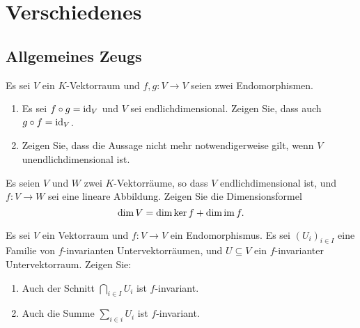 \section{Verschiedenes}










\subsection{Allgemeines Zeugs}







\begin{question}[subtitle = Invertierbarkeit im Endlichdimensionalen]{1}
  Es sei $V$ ein $K$-Vektorraum und $f, g \colon V \to V$ seien zwei Endomorphismen.
  \begin{enumerate}[leftmargin=*]
    \item
      Es sei $f \circ g = \operatorname{id}_V$ und $V$ sei endlichdimensional.
      Zeigen Sie, dass auch $g \circ f = \operatorname{id}_V$.
    \item
      Zeigen Sie, dass die Aussage nicht mehr notwendigerweise gilt, wenn $V$ unendlichdimensional ist.
  \end{enumerate}
\end{question}


\begin{question}[subtitle = Dimensionsformel]{1}
  Es seien $V$ und $W$ zwei $K$-Vektorräume, so dass $V$ endlichdimensional ist, und $f \colon V \to W$ sei eine lineare Abbildung.
  Zeigen Sie die Dimensionsformel
  \[
    \dim V = \dim \ker f + \dim \operatorname{im} f.
  \]
\end{question}


\begin{question}[subtitle = Operationen mit invarianten Unterräumen]{1}
  Es sei $V$ ein Vektorraum und $f \colon V \to V$ ein Endomorphismus.
  Es sei $(U_i)_{i \in I}$ eine Familie von $f$-invarianten Untervektorräumen, und $U \subseteq V$ ein $f$-invarianter Untervektorraum.
  Zeigen Sie:
  \begin{enumerate}[leftmargin=*]
    \item
      Auch der Schnitt $\bigcap_{i \in I} U_i$ ist $f$-invariant.
    \item
      Auch die Summe $\sum_{i \in i} U_i$ ist $f$-invariant.
  \end{enumerate}
\end{question}





